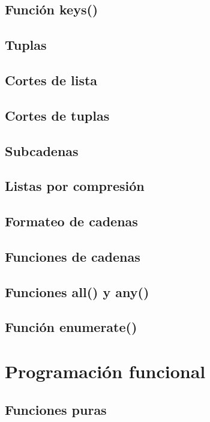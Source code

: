 \documentclass{article}
\begin{document}
\subsection{Función keys()}

\subsection{Tuplas}

\subsection{Cortes de lista}

\subsection{Cortes de tuplas}

\subsection{Subcadenas}

\subsection{Listas por compresión}

\subsection{Formateo de cadenas}

\subsection{Funciones de cadenas}

\subsection{Funciones all() y any()}

\subsection{Función enumerate()}

\section{Programación funcional}

\subsection{Funciones puras}
\end{document}
